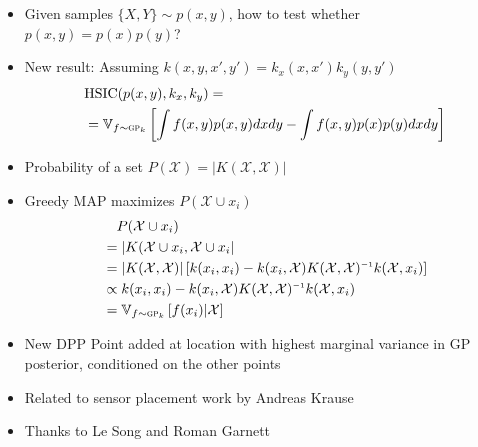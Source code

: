 \documentclass[usenames,dvipsnames]{beamer}
\begin{document}
\begin{frame}[plain, t]
	\titlebodyskip
	

	\slidebody
	{
			\begin{itemize}
				\item Given samples $\{X,Y\} \sim p(x,y)$, how to test whether $p(x,y) = p(x)p(y)$?
				\item New result:  Assuming $k(x,y,x',y') = k_x(x,x') k_y(y,y')$
				\begin{align*}
					& {\rm HSIC}(p(x,y),k_x, k_y) =  \\
					& = \mathbb{V}_{f \sim {\textsc{gp}}_k} \left[ {\int f(x,y) p(x, y) dx dy - \int f(x,y) p(x) p(y) dx dy} \right]
				\end{align*}								
			\end{itemize}	
	}
	\end{frame}



\begin{frame}[plain, t]
	\titlebodyskip
	
	\slidebody
	{
	\begin{itemize}
		\item Probability of a set $P(\mathcal{X}) = |K(\mathcal{X}, \mathcal{X})|$
		\pause
		\item Greedy MAP maximizes $P(\mathcal{X} \cup x_i)$
		\pause
		\begin{align*}
			& \quad P(\mathcal{X} \cup x_i) \\
			 & = |K(\mathcal{X} \cup x_i, \mathcal{X} \cup x_i| \\
			& = |K(\mathcal{X}, \mathcal{X})| \left[k(x_i, x_i) - k(x_i, \mathcal{X}) K(\mathcal{X}, \mathcal{X})\inv k(\mathcal{X}, x_i) \right] \\
			& \propto k(x_i, x_i) - k(x_i, \mathcal{X}) K(\mathcal{X}, \mathcal{X})\inv k(\mathcal{X}, x_i)\\
			& = \varianceargs{f \sim \gp_k}{ f(x_i) | \mathcal{X}}
		\end{align*}
		\pause
		\vspace{-.8cm}
		\item New DPP Point added at location with highest marginal variance in GP posterior, conditioned on the other points	
		\pause				
		\item Related to sensor placement work by Andreas Krause
		\pause					
		\item Thanks to Le Song and Roman Garnett
	\end{itemize}
	}
\end{frame}
\end{document}
